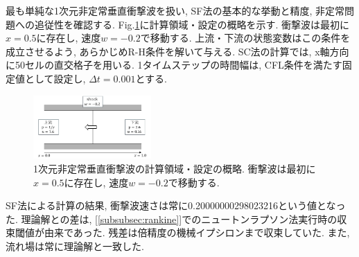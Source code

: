 \documentclass[a4j]{jarticle}
\begin{document}
最も単純な1次元非定常垂直衝撃波を扱い, SF法の基本的な挙動と精度, 非定常問題への追従性を確認する.
Fig.\ref{fig:1Dsituation}に計算領域・設定の概略を示す.
衝撃波は最初に$x=0.5$に存在し, 速度$w=-0.2$で移動する.
上流・下流の状態変数はこの条件を成立させるよう, あらかじめR-H条件を解いて与える.
SC法の計算では, x軸方向に50セルの直交格子を用いる.
1タイムステップの時間幅は, CFL条件を満たす固定値として設定し, $\Delta t = 0.001$とする.
\begin{figure}[H]
    \vspace*{-5mm}
    \begin{center}
        \includegraphics[width=0.4\textwidth]{1Dsituation.pdf}
    \end{center}
    \caption{1次元非定常垂直衝撃波の計算領域・設定の概略.
    衝撃波は最初に$x=0.5$に存在し, 速度$w=-0.2$で移動する.}
    \label{fig:1Dsituation}
\end{figure}
SF法による計算の結果, 衝撃波速さは常に0.20000000298023216という値となった.
理論解との差は, [\ref{subsubsec:rankine}]でのニュートンラプソン法実行時の収束閾値が由来であった. 
残差は倍精度の機械イプシロンまで収束していた. また, 流れ場は常に理論解と一致した.
\end{document}
